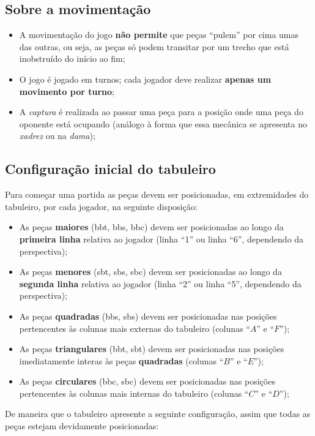 \subsection{Sobre a movimentação}
\begin{itemize}
  \item A movimentação do jogo \textbf{não permite} que peças ``pulem'' por cima umas das outras, ou seja, as peças só
    podem transitar por um trecho que está inobstruído do início ao fim;
  \item O jogo é jogado em turnos; cada jogador deve realizar \textbf{apenas um movimento por turno};
  \item A \textit{captura} é realizada ao passar uma peça para a posição onde uma peça do oponente está ocupando
    (análogo à forma que essa mecânica se apresenta no \textit{xadrez} ou na \textit{dama});
\end{itemize}

\newpage

\subsection{Configuração inicial do tabuleiro}
Para começar uma partida as peças devem ser posicionadas, em extremidades do tabuleiro, por cada jogador, na seguinte
disposição:

\begin{itemize}
  \item As peças \textbf{maiores} (\gls{bbt}, \gls{bbs}, \gls{bbc}) devem ser posicionadas ao longo da \textbf{primeira linha} relativa
    ao jogador (linha ``1'' ou linha ``6'', dependendo da perspectiva);
  \item As peças \textbf{menores} (\gls{sbt}, \gls{sbs}, \gls{sbc}) devem ser posicionadas ao longo da \textbf{segunda linha} relativa
    ao jogador (linha ``2'' ou linha ``5'', dependendo da perspectiva);
  \item As peças \textbf{quadradas} (\gls{bbs}, \gls{sbs}) devem ser posicionadas nas posições pertencentes às colunas mais
    externas do tabuleiro (colunas ``$A$'' e ``$F$'');
  \item As peças \textbf{triangulares} (\gls{bbt}, \gls{sbt}) devem ser posicionadas nas posições imediatamente interas às peças
    \textbf{quadradas} (colunas ``$B$'' e ``$E$'');
  \item As peças \textbf{circulares} (\gls{bbc}, \gls{sbc}) devem ser posicionadas nas posições pertencentes às colunas mais
    internas do tabuleiro (colunas ``$C$'' e ``$D$'');
\end{itemize}
De maneira que o tabuleiro apresente a seguinte configuração, assim que todas as peças estejam devidamente posicionadas:

